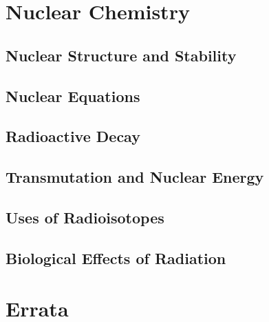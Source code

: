 \documentclass[12pt, openany, letterpaper]{memoir}
\begin{document}
\setcounter{chapter}{20}
\chapter{Nuclear Chemistry}

\section{Nuclear Structure and Stability}

\section{Nuclear Equations}

\section{Radioactive Decay}

\section{Transmutation and Nuclear Energy}

\section{Uses of Radioisotopes}

\section{Biological Effects of Radiation}

\backmatter
\chapter{Errata}
\end{document}
